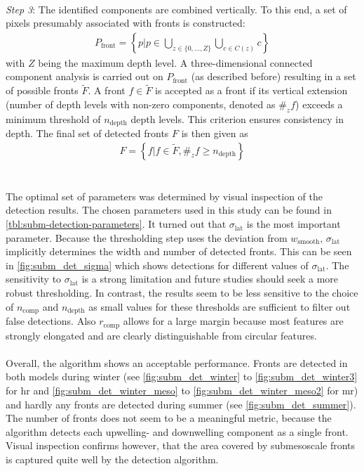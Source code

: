 \\
\textit{Step 3}: The identified components are combined vertically. To this end, a set of pixels presumably associated with fronts is constructed:
\begin{align}
    P_\text{front} = \left\{p | p \in \bigcup_{z \in \{0, ..., Z\}} \bigcup_{c \in C(z)}c\right\}
\end{align}
with $Z$ being the maximum depth level. A three-dimensional connected component analysis is carried out on $P_\text{front}$ (as described before) resulting in a set of possible fronts $\widetilde{F}$. A front $f \in \widetilde{F}$ is accepted as a front if its vertical extension (number of depth levels with non-zero components, denoted as $\#_zf$) exceeds a minimum threshold of $n_\text{depth}$ depth levels. This criterion ensures consistency in depth. The final set of detected fronts $F$ is then given as
\begin{align}
    F = \left\{f|f \in \widetilde{F}, \#_zf \ge n_\text{depth}\right\}
\end{align}
\\
\\
The optimal set of parameters was determined by visual inspection of the detection results. The chosen parameters used in this study can be found in \autoref{tbl:subm-detection-parameters}. It turned out that $\sigma_\text{lat}$ is the most important parameter. Because the thresholding step uses the deviation from $w_\text{smooth}$, $\sigma_\text{lat}$ implicitly determines the width and number of detected fronts. This can be seen in \autoref{fig:subm_det_sigma} which shows detections for different values of $\sigma_\text{lat}$. The sensitivity to $\sigma_\text{lat}$ is a strong limitation and future studies should seek a more robust thresholding. In contrast, the results seem to be less sensitive to the choice of $n_\text{comp}$ and $n_\text{depth}$ as small values for these thresholds are sufficient to filter out false detections. Also $r_\text{comp}$ allows for a large margin because most features are strongly elongated and are clearly distinguishable from circular features.\\
\\
Overall, the algorithm shows an acceptable performance. Fronts are detected in both models during winter (see \autoref{fig:subm_det_winter} to \ref{fig:subm_det_winter3} for \ac{hr} and \autoref{fig:subm_det_winter_meso} to \ref{fig:subm_det_winter_meso2} for \ac{mr}) and hardly any fronts are detected during summer (see \autoref{fig:subm_det_summer}). The number of fronts does not seem to be a meaningful metric, because the algorithm detects each upwelling- and downwelling component as a single front. Visual inspection confirms however, that the area covered by submesoscale fronts is captured quite well by the detection algorithm.\\
